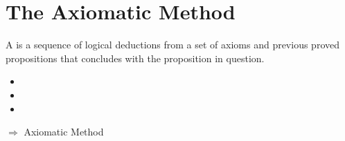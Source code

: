 \section{The Axiomatic Method}
\begin{definition}
    A  is a sequence of logical deductions from a set of axioms
    and previous proved propositions that concludes with the proposition in question.
\end{definition}
\begin{itemize}
    \item {}
    \item {}
    \item {} 
\end{itemize}
$\Rightarrow$ Axiomatic Method